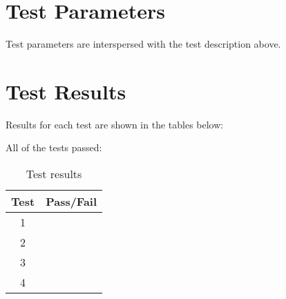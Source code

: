 \section{Test Parameters}
Test parameters are interspersed with the test description above.

\section{Test Results}
Results for each test are shown in the tables below:





All of the tests passed:
\begin{table}[H]
	\caption{Test results}
	\label{tab:results}
	\centering \fontsize{10}{10}\selectfont
	\begin{tabular}{c | c  } %
		\hline
		\textbf{Test} 						  		&\textbf{Pass/Fail} \\ \hline
	   1	   			&  \\ \hline
		2	   			&  \\ \hline
		3	   			&  \\ \hline
		4	   			&  \\ \hline
	\end{tabular}
\end{table}





\pagebreak %